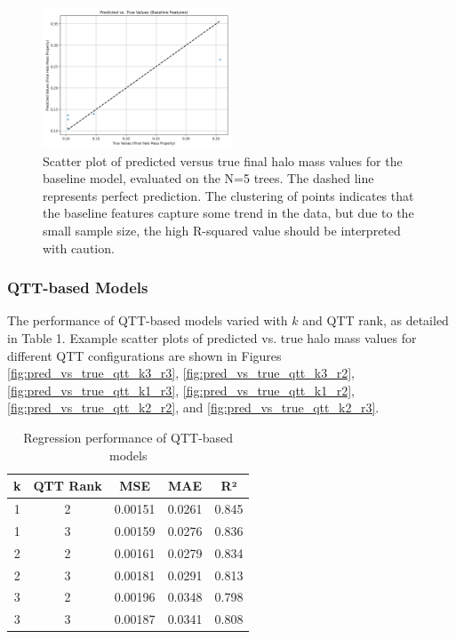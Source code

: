\documentclass[twocolumn]{aastex631}
\begin{document}
\begin{figure}[h!]
    \centering
    \includegraphics[width=0.5\textwidth]{../input_files/plots/pred_vs_true_baseline_1_20250524-175150.png}
    \caption{Scatter plot of predicted versus true final halo mass values for the baseline model, evaluated on the N=5 trees. The dashed line represents perfect prediction. The clustering of points indicates that the baseline features capture some trend in the data, but due to the small sample size, the high R-squared value should be interpreted with caution.
}
    \label{fig:pred_vs_true_baseline}
\end{figure}

\subsubsection{QTT-based Models}
The performance of QTT-based models varied with $k$ and QTT rank, as detailed in Table 1. Example scatter plots of predicted vs. true halo mass values for different QTT configurations are shown in Figures \ref{fig:pred_vs_true_qtt_k3_r3}, \ref{fig:pred_vs_true_qtt_k3_r2}, \ref{fig:pred_vs_true_qtt_k1_r3}, \ref{fig:pred_vs_true_qtt_k1_r2}, \ref{fig:pred_vs_true_qtt_k2_r2}, and \ref{fig:pred_vs_true_qtt_k2_r3}.

\begin{table}[h!]
    \centering
    \caption{Regression performance of QTT-based models}
    \begin{tabular}{c c c c c}
        \hline
        k & QTT Rank & MSE & MAE & R² \\
        \hline
        1 & 2 & 0.00151 & 0.0261 & 0.845 \\
        1 & 3 & 0.00159 & 0.0276 & 0.836 \\
        2 & 2 & 0.00161 & 0.0279 & 0.834 \\
        2 & 3 & 0.00181 & 0.0291 & 0.813 \\
        3 & 2 & 0.00196 & 0.0348 & 0.798 \\
        3 & 3 & 0.00187 & 0.0341 & 0.808 \\
        \hline
    \end{tabular}
\end{table}
\end{document}
